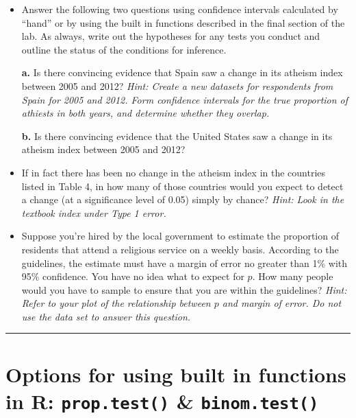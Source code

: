 \documentclass[]{book}
\theoremstyle{definition}
\theoremstyle{definition}
\theoremstyle{definition}
\theoremstyle{remark}
\begin{document}
\begin{itemize}
\item
  Answer the following two questions using confidence intervals
  calculated by ``hand'' or by using the built in functions described in
  the final section of the lab. As always, write out the hypotheses for
  any tests you conduct and outline the status of the conditions for
  inference.

  \textbf{a.} Is there convincing evidence that Spain saw a change in
  its atheism index between 2005 and 2012? \emph{Hint: Create a new
  datasets for respondents from Spain for 2005 and 2012. Form confidence
  intervals for the true proportion of athiests in both years, and
  determine whether they overlap.}

  \textbf{b.} Is there convincing evidence that the United States saw a
  change in its atheism index between 2005 and 2012?
\item
  If in fact there has been no change in the atheism index in the
  countries listed in Table 4, in how many of those countries would you
  expect to detect a change (at a significance level of 0.05) simply by
  chance? \emph{Hint: Look in the textbook index under Type 1 error.}
\item
  Suppose you're hired by the local government to estimate the
  proportion of residents that attend a religious service on a weekly
  basis. According to the guidelines, the estimate must have a margin of
  error no greater than 1\% with 95\% confidence. You have no idea what
  to expect for \(p\). How many people would you have to sample to
  ensure that you are within the guidelines? \emph{Hint: Refer to your
  plot of the relationship between \(p\) and margin of error. Do not use
  the data set to answer this question.}
\end{itemize}

\begin{center}\rule{0.5\linewidth}{\linethickness}\end{center}

\hypertarget{options-for-using-built-in-functions-in-r-prop.test-binom.test}{%
\section{\texorpdfstring{Options for using built in functions in R:
\texttt{prop.test()} \&
\texttt{binom.test()}}{Options for using built in functions in R: prop.test() \& binom.test()}}\label{options-for-using-built-in-functions-in-r-prop.test-binom.test}}
\end{document}
